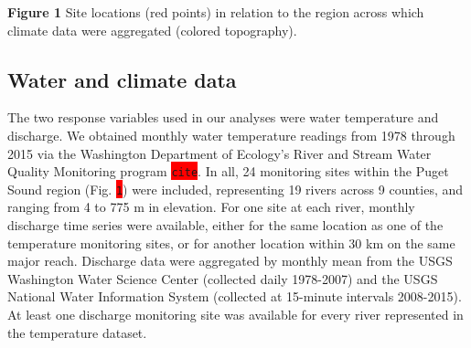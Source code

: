 \documentclass{article}
\begin{document}
\begin{center}
\textbf{Figure 1} Site locations (red points) in relation to the region across which climate data were aggregated (colored topography).
\end{center}

\subsection*{Water and climate data}

The two response variables used in our analyses were water temperature and discharge. We obtained monthly water temperature readings from 1978 through 2015 via the Washington Department of Ecology's River and Stream Water Quality Monitoring program \colorbox{red}{\lstinline{cite}}. In all, 24 monitoring sites within the Puget Sound region (Fig. \colorbox{red}{\lstinline{1}}) were included, representing 19 rivers across 9 counties, and ranging from 4 to 775 m in elevation. For one site at each river, monthly discharge time series were available, either for the same location as one of the temperature monitoring sites, or for another location within 30 km on the same major reach. Discharge data were aggregated by monthly mean from the USGS Washington Water Science Center (collected daily 1978-2007) and the USGS National Water Information System (collected at 15-minute intervals 2008-2015). At least one discharge monitoring site was available for every river represented in the temperature dataset.
\end{document}
